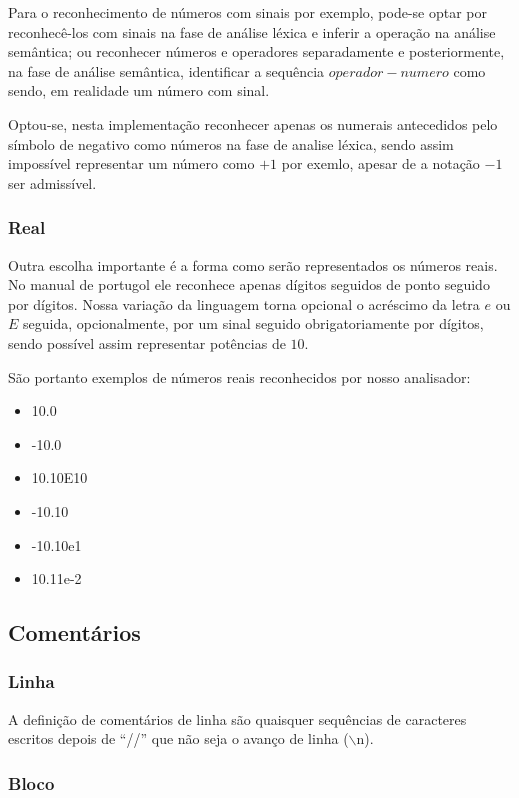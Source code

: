 \documentclass[a4paper,12pt]{report}
\begin{document}
Para o reconhecimento de n\'umeros com sinais por exemplo, pode-se optar por reconhec\^e-los com sinais na fase de an\'alise
l\'exica e inferir a opera\c{c}\~ao na an\'alise sem\^antica; ou reconhecer n\'umeros e operadores separadamente e posteriormente, 
na fase de an\'alise sem\^antica, identificar a sequ\^encia $operador-numero$ como sendo, em realidade um n\'umero com sinal.

Optou-se, nesta implementa\c{c}\~ao reconhecer apenas os numerais antecedidos pelo s\'imbolo de 
negativo como n\'umeros na fase de analise l\'exica, sendo assim imposs\'ivel representar um n\'umero como $+1$ por exemlo, apesar de a nota\c{c}\~ao $-1$ ser admiss\'ivel.

\subsubsection{Real}
Outra escolha importante \'e a forma como ser\~ao representados os n\'umeros reais. No manual de portugol ele reconhece apenas
d\'igitos seguidos de ponto seguido por d\'igitos.
Nossa varia\c{c}\~ao da linguagem torna opcional o acr\'escimo da letra $e$ ou $E$ seguida, opcionalmente, por um sinal seguido obrigatoriamente por d\'igitos, sendo
poss\'ivel assim representar pot\^encias de $10$.

S\~ao portanto exemplos de n\'umeros reais reconhecidos por nosso analisador:
\begin{itemize}
 \item 10.0
 \item -10.0
 \item 10.10E10
 \item -10.10
 \item -10.10e1
 \item 10.11e-2
\end{itemize}


\subsection{Coment\'arios}

\subsubsection{Linha}

A defini\c{c}\~ao de coment\'arios de linha s\~ao quaisquer sequ\^encias de caracteres 
escritos depois de ``//'' que n\~ao seja o avan\c{c}o de linha ($\backslash$n).

\subsubsection{Bloco}
\end{document}
